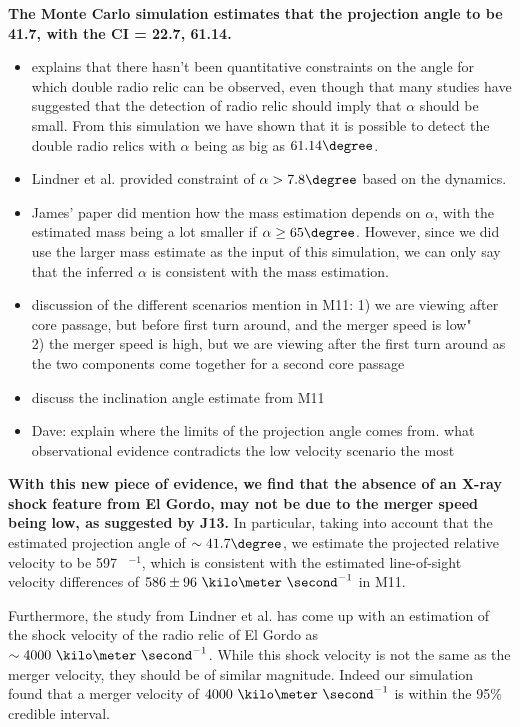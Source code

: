 \textbf{The Monte Carlo simulation estimates that the projection angle to
be 41.7\degree, with the CI = 22.7\degree, 61.14\degree.} 
\begin{itemize}
\item explains that there hasn't been quantitative constraints on the angle
for which double radio relic can be observed, even though that many studies
have suggested that the detection of radio relic should imply that $\alpha$
should be small. From this simulation we have shown that it is possible to detect
the double radio relics with $\alpha$ being as big as $61.14\degree$. 

\item Lindner et al. provided constraint of $\alpha > 7.8 \degree$ based 
on the dynamics.
\item James' paper did mention how the mass estimation depends on $\alpha$,
with the estimated mass being a lot smaller if $\alpha \ge 65\degree$. 
However, since we did use the larger mass estimate as the input of this
simulation, we can only say that the inferred $\alpha$ is consistent with
the mass estimation. 
\item discussion of the different scenarios mention in M11:
1) we are viewing after core passage, but before first turn around, and
the merger speed is low"\\
2) the merger speed is high, but we are viewing after the first turn
around as the two components come together for a second core passage
\item discuss the inclination angle estimate from M11
\item Dave: explain where the limits of the projection angle comes
from. what observational evidence contradicts the low velocity
scenario the most
\end{itemize}

\textbf{With this new piece of evidence, we find that the absence of an
X-ray shock feature from El Gordo, may not be due to the merger speed being
low, as suggested by J13.} 
In particular, taking into account that the estimated projection angle of 
$\sim 41.7\degree$, we estimate the projected relative velocity to be 597 \kilo \meter~\second$^{-1}$, which is consistent with the estimated line-of-sight velocity differences of $586 \pm  96~\kilo \meter ~\second^{-1}$ in M11. 

Furthermore, the study from \cite{L13} Lindner et al. has come up
with an estimation of the shock velocity of the radio relic of El Gordo as 
$\sim 4000~\kilo \meter~\second^{-1}$. While this shock velocity is not the
same as the merger velocity, they should be of similar magnitude. Indeed
our simulation found that a merger velocity of $4000~\kilo
\meter~\second^{-1}$ is within the 95\% credible interval. 
